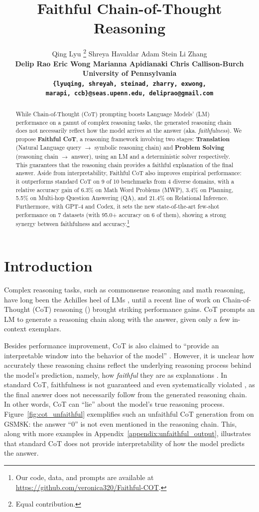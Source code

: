 \documentclass[11pt]{article}
\title{Faithful Chain-of-Thought Reasoning}
\author{
  Qing Lyu \thanks{\hspace{4pt} Equal contribution.} \hspace{5mm}
  Shreya Havaldar\samethanks \hspace{5mm}
  Adam Stein\samethanks \hspace{5mm}
  Li Zhang\\
  \bf{Delip Rao} \hspace{5mm}
  \bf{Eric Wong} \hspace{5mm}
  \bf{Marianna Apidianaki} \hspace{5mm}
  \bf{Chris Callison-Burch} \\
  University of Pennsylvania \\
  \texttt{\{lyuqing, shreyah, steinad, zharry, exwong,}\\
  \texttt{marapi, ccb\}@seas.upenn.edu, deliprao@gmail.com}
}
\begin{document}
\maketitle
\begin{abstract}
While Chain-of-Thought (CoT) prompting boosts Language Models' (LM) performance on a gamut of complex reasoning tasks, the generated reasoning chain does not necessarily reflect how the model arrives at the answer (aka. \emph{faithfulness}). We propose \textbf{Faithful CoT}, a reasoning framework involving two stages: \textbf{Translation} (Natural Language query $\rightarrow$ symbolic reasoning chain) and \textbf{Problem Solving} (reasoning chain $\rightarrow$ answer), using an LM and a deterministic solver respectively. This guarantees that the reasoning chain provides a faithful explanation of the final answer. Aside from interpretability, Faithful CoT also improves empirical performance: it outperforms standard CoT on 9 of 10 benchmarks from 4 diverse domains, with a relative accuracy gain of 6.3\% on Math Word Problems (MWP), 3.4\% on Planning, 5.5\% on Multi-hop Question Answering (QA), and 21.4\% on Relational Inference. Furthermore, with GPT-4 and Codex, it sets the new state-of-the-art few-shot performance on 7 datasets (with 95.0+ accuracy on 6 of them), showing a strong synergy between faithfulness and accuracy.\footnote{Our code, data, and prompts are available at \url{https://github.com/veronica320/Faithful-COT}.}
\end{abstract}

\section{Introduction}
\label{sec:intro}

Complex reasoning tasks, such as commonsense reasoning and math reasoning, have long been the Achilles heel of LMs \cite{bengio_system_2019}, until a recent line of work on Chain-of-Thought (CoT) reasoning (\citealp[i.a.]{wei_chain_2022, wang_self-consistency_2022}) brought striking performance gains. CoT prompts an LM to generate a reasoning chain along with the answer, given only a few in-context exemplars. 

Besides performance improvement, CoT is also claimed to ``provide an interpretable window into the behavior of the model'' \cite{wei_chain_2022}. However, it is unclear how accurately these reasoning chains reflect the underlying reasoning process behind the model's prediction, namely, how \emph{faithful} they are as explanations \cite[i.a.]{jacovi_towards_2020}. 
In standard CoT, faithfulness is not guaranteed and even systematically violated \cite{turpin_language_2023}, as the final answer does not necessarily follow from the generated reasoning chain.
In other words, CoT can ``lie'' about the model's true reasoning process.
Figure~\ref{fig:cot_unfaithful} exemplifies such an unfaithful CoT generation from \citet{wei_chain_2022} on GSM8K:
the answer ``0'' is not even mentioned in the reasoning chain. This, along with more examples in  Appendix~\ref{appendix:unfaithful_output}, illustrates that standard CoT does not provide interpretability of how the model predicts the answer.
\end{document}
